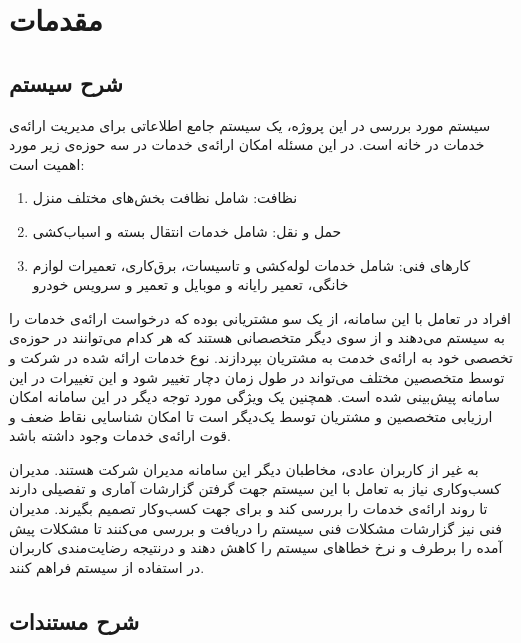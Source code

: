 
\chapter{مقدمات}

\section{شرح سیستم}

سیستم مورد بررسی در این پروژه، ‌یک سیستم جامع اطلاعاتی برای مدیریت ارائه‌ی خدمات در خانه است. 
در این مسئله امکان ارائه‌ی خدمات در سه حوزه‌ی زیر مورد اهمیت است:

\begin{enumerate}
\item
نظافت: شامل نظافت بخش‌های مختلف منزل 
\item
حمل و نقل: شامل خدمات انتقال بسته و اسباب‌کشی
\item 
کارهای فنی: شامل خدمات لوله‌کشی و تاسیسات، برق‌کاری، تعمیرات لوازم خانگی، تعمیر رایانه و موبایل و تعمیر و سرویس خودرو

\end{enumerate}

افراد در تعامل با این سامانه، از یک سو مشتریانی بوده که درخواست ارائه‌ی خدمات را به سیستم می‌دهند و از سوی دیگر متخصصانی هستند که هر کدام می‌توانند در حوزه‌ی تخصصی خود به ارائه‌ی خدمت به مشتریان بپردازند. نوع خدمات ارائه شده در شرکت و توسط متخصصین مختلف می‌تواند در طول زمان دچار تغییر شود و این تغییرات در این سامانه پیش‌بینی شده است. همچنین یک ویژگی مورد توجه دیگر در این سامانه امکان ارزیابی متخصصین و مشتریان توسط یک‌دیگر است تا امکان شناسایی نقاط ضعف و قوت ارائه‌ی خدمات وجود داشته باشد.

به غیر از کاربران عادی، مخاطبان دیگر این سامانه مدیران شرکت هستند. مدیران کسب‌وکاری نیاز به تعامل با این سیستم جهت گرفتن گزارشات آماری و تفصیلی دارند تا روند ارائه‌ی خدمات را بررسی کند و برای جهت کسب‌و‌کار تصمیم بگیرند. مدیران فنی نیز گزارشات مشکلات فنی سیستم را دریافت و بررسی می‌کنند تا مشکلات پیش آمده را برطرف و نرخ خطاهای سیستم را کاهش دهند و درنتیجه رضایت‌مندی کاربران در استفاده از سیستم فراهم کنند.





\section{شرح مستندات}


